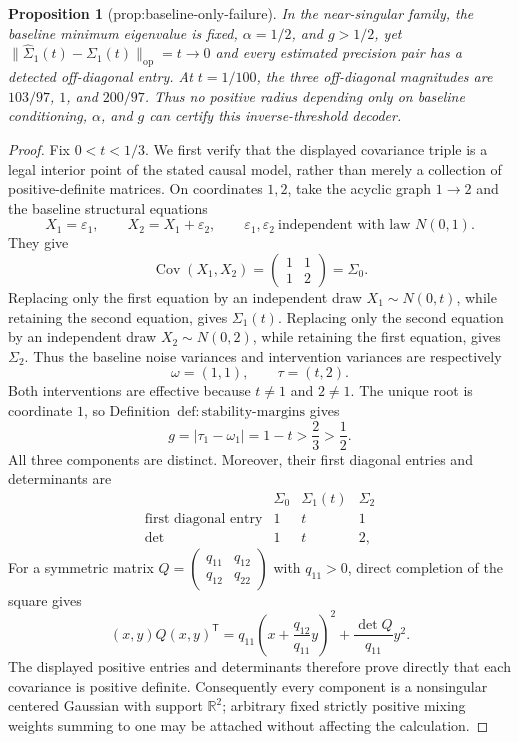 \documentclass{article}
\newtheorem{proposition}{Proposition}
\begin{document}
\begin{proposition}[prop:baseline-only-failure]\label{prop:baseline-only-failure}
In the near-singular family, the baseline minimum eigenvalue is fixed, \(\alpha=1/2\), and \(g>1/2\), yet \(\|\widehat\Sigma_1(t)-\Sigma_1(t)\|_{\mathrm{op}}=t\to0\) and every estimated precision pair has a detected off-diagonal entry. At \(t=1/100\), the three off-diagonal magnitudes are \(103/97\), \(1\), and \(200/97\). Thus no positive radius depending only on baseline conditioning, \(\alpha\), and \(g\) can certify this inverse-threshold decoder.
\end{proposition}
\begin{proof}
Fix \(0<t<1/3\).  We first verify that the displayed covariance triple is a legal interior point of the stated causal model, rather than merely a collection of positive-definite matrices.  On coordinates \(1,2\), take the acyclic graph \(1\mathbin{\to}2\) and the baseline structural equations
\[
 X_1=\varepsilon_1,\qquad X_2=X_1+\varepsilon_2,
 \qquad \varepsilon_1,\varepsilon_2\ \text{independent with law }N(0,1).
\]
They give
\[
 \operatorname{Cov}(X_1,X_2)
 =\begin{pmatrix}1&1\\1&2\end{pmatrix}=\Sigma_0.
\]
Replacing only the first equation by an independent draw \(X_1\sim N(0,t)\), while retaining the second equation, gives \(\Sigma_1(t)\).  Replacing only the second equation by an independent draw \(X_2\sim N(0,2)\), while retaining the first equation, gives \(\Sigma_2\).  Thus the baseline noise variances and intervention variances are respectively
\[
 \omega=(1,1),\qquad \tau=(t,2).
\]
Both interventions are effective because \(t\ne1\) and \(2\ne1\).  The unique root is coordinate \(1\), so Definition~\(\mathrm{def:stability\text{-}margins}\) gives
\[
 g=|\tau_1-\omega_1|=1-t>\frac23>\frac12.
\]
All three components are distinct.  Moreover, their first diagonal entries and determinants are
\[
 \begin{array}{c|ccc}
  &\Sigma_0&\Sigma_1(t)&\Sigma_2\\ \hline
 \text{first diagonal entry}&1&t&1\\
 \det&1&t&2,
 \end{array}
\]
For a symmetric matrix \(Q=\left(\begin{smallmatrix}q_{11}&q_{12}\\q_{12}&q_{22}\end{smallmatrix}\right)\) with \(q_{11}>0\), direct completion of the square gives
\[
 (x,y)Q(x,y)^{\mathsf T}
 =q_{11}\left(x+\frac{q_{12}}{q_{11}}y\right)^2
  +\frac{\det Q}{q_{11}}y^2.
\]
The displayed positive entries and determinants therefore prove directly that each covariance is positive definite.  Consequently every component is a nonsingular centered Gaussian with support \(\mathbb R^2\); arbitrary fixed strictly positive mixing weights summing to one may be attached without affecting the calculation.


\end{proof}
\end{document}
